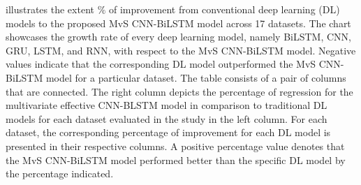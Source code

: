 \documentclass[a4paper, fleqn]{cas-sc}
\theoremstyle{definition}
\theoremstyle{remark}
\begin{document}
   illustrates the extent $\%$ of improvement from conventional deep learning (DL) models to the proposed MvS CNN-BiLSTM model across 17 datasets. The chart showcases the growth rate of every deep learning model,  namely BiLSTM,  CNN,  GRU,  LSTM,  and RNN,  with respect to the MvS CNN-BiLSTM model. Negative values indicate that the corresponding DL model outperformed the MvS CNN-BiLSTM model for a particular dataset. The table consists of a pair of columns that are connected. The right column depicts the percentage of regression for the multivariate effective CNN-BLSTM model in comparison to traditional DL models for each dataset evaluated in the study in the left column. For each dataset,  the corresponding percentage of improvement for each DL model is presented in their respective columns. A positive percentage value denotes that the MvS CNN-BiLSTM model performed better than the specific DL model by the percentage indicated.

\end{document}
